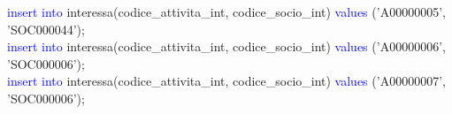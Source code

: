 \documentclass{article}
\begin{document}
\begin{flushleft}
{        \hspace*{0.5em}\textcolor{blue}{insert into} interessa(codice\_attivita\_int, codice\_socio\_int) \textcolor{blue}{values} \hspace*{0.5em}('A00000005', 'SOC000044'); \\
        \hspace*{0.5em}\textcolor{blue}{insert into} interessa(codice\_attivita\_int, codice\_socio\_int) \textcolor{blue}{values} \hspace*{0.5em}('A00000006', 'SOC000006'); \\
        \hspace*{0.5em}\textcolor{blue}{insert into} interessa(codice\_attivita\_int, codice\_socio\_int) \textcolor{blue}{values} \hspace*{0.5em}('A00000007', 'SOC000006'); \\}
    \end{flushleft}
\end{document}
